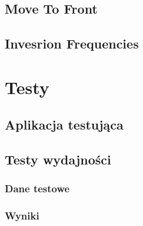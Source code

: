 \documentclass[a4paper,12pt]{article}
\begin{document}
\subsection{Move To Front}
\label{ch:mtf}


\subsection{Invesrion Frequencies}
\label{ch:if}


\section{Testy}

\subsection{Aplikacja testująca}

\subsection{Testy wydajności}

\subsubsection{Dane testowe}

\subsubsection{Wyniki}

{}

\end{document}
